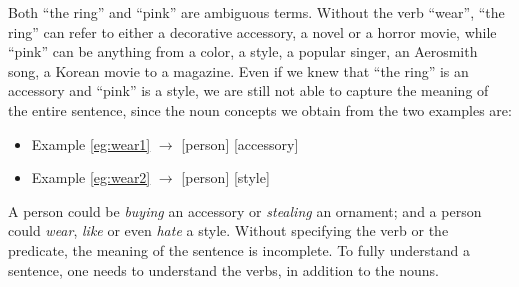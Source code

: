 %
Both ``the ring'' and ``pink'' are ambiguous terms.
Without the verb ``wear'', ``the ring'' can refer to either
a decorative accessory, a novel or a horror movie,
while ``pink'' can be anything from
a color, a style, a popular singer, an Aerosmith song,
a Korean movie to a magazine.
%
%
Even if we knew that ``the ring'' is an accessory and
``pink'' is a style, we are still not able to capture the meaning
of the entire sentence, since the noun concepts we obtain from the
two examples are:
\begin{itemize}
\item Example \ref{eg:wear1} $\longrightarrow$ [person] [accessory]
\item Example \ref{eg:wear2} $\longrightarrow$ [person] [style]
\end{itemize}
A person could be {\em buying} an accessory or {\em stealing}
an ornament; and a person could {\em wear}, {\em like} or
even {\em hate} a style. Without specifying the verb
or the predicate, the meaning of the sentence is incomplete.
To fully understand a sentence, one needs to understand the verbs,
in addition to the nouns.

